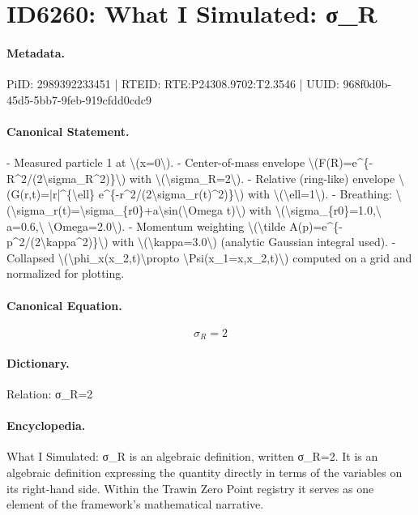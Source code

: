 \section*{ID6260: What I Simulated: σ\_R}
\paragraph{Metadata.}
PiID: 2989392233451 | RTEID: RTE:P24308.9702:T2.3546 | UUID: 968f0d0b-45d5-5bb7-9feb-919cfdd0cdc9

\paragraph{Canonical Statement.}
- Measured particle 1 at \textbackslash{}(x=0\textbackslash{}). - Center-of-mass envelope \textbackslash{}(F(R)=e\textasciicircum{}\{-R\textasciicircum{}2/(2\textbackslash{}sigma\_R\textasciicircum{}2)\}\textbackslash{}) with \textbackslash{}(\textbackslash{}sigma\_R=2\textbackslash{}). - Relative (ring-like) envelope \textbackslash{}(G(r,t)=|r|\textasciicircum{}\{\textbackslash{}ell\} e\textasciicircum{}\{-r\textasciicircum{}2/(2\textbackslash{}sigma\_r(t)\textasciicircum{}2)\}\textbackslash{}) with \textbackslash{}(\textbackslash{}ell=1\textbackslash{}). - Breathing: \textbackslash{}(\textbackslash{}sigma\_r(t)=\textbackslash{}sigma\_\{r0\}+a\textbackslash{}sin(\textbackslash{}Omega t)\textbackslash{}) with \textbackslash{}(\textbackslash{}sigma\_\{r0\}=1.0,\textbackslash{} a=0.6,\textbackslash{} \textbackslash{}Omega=2.0\textbackslash{}). - Momentum weighting \textbackslash{}(\textbackslash{}tilde A(p)=e\textasciicircum{}\{-p\textasciicircum{}2/(2\textbackslash{}kappa\textasciicircum{}2)\}\textbackslash{}) with \textbackslash{}(\textbackslash{}kappa=3.0\textbackslash{}) (analytic Gaussian integral used). - Collapsed \textbackslash{}(\textbackslash{}phi\_x(x\_2,t)\textbackslash{}propto \textbackslash{}Psi(x\_1=x,x\_2,t)\textbackslash{}) computed on a grid and normalized for plotting.

\paragraph{Canonical Equation.}
\[
\sigma_R=2
\]

\paragraph{Dictionary.}
Relation: σ\_R=2

\paragraph{Encyclopedia.}
What I Simulated: σ\_R is an algebraic definition, written σ\_R=2. It is an algebraic definition expressing the quantity directly in terms of the variables on its right-hand side. Within the Trawin Zero Point registry it serves as one element of the framework's mathematical narrative.
